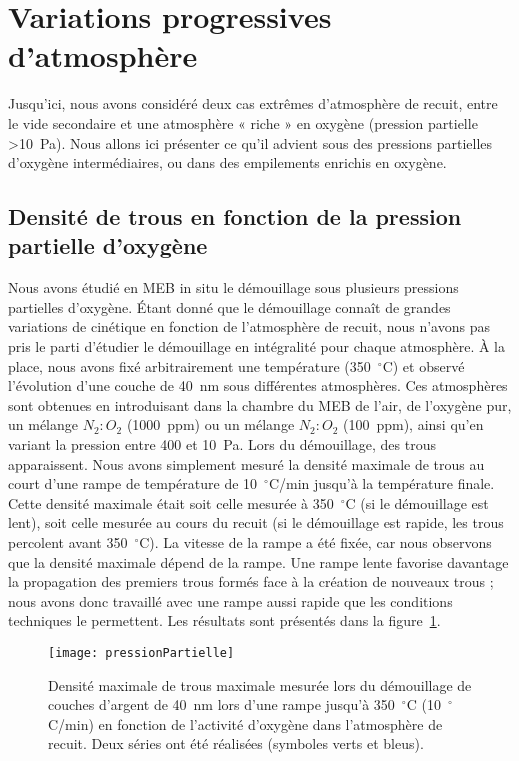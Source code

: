 \section{Variations progressives d'atmosphère}
Jusqu’ici, nous avons considéré deux cas extrêmes d’atmosphère de recuit, entre le vide secondaire et une atmosphère « riche » en oxygène (pression partielle >10~Pa). Nous allons ici présenter ce qu’il advient sous des pressions partielles d’oxygène intermédiaires, ou dans des empilements enrichis en oxygène.\par 
	\subsection{Densité de trous en fonction de la pression partielle d'oxygène}
Nous avons étudié en MEB in situ le démouillage sous plusieurs pressions partielles d’oxygène. Étant donné que le démouillage connaît de grandes variations de cinétique en fonction de l’atmosphère de recuit, nous n’avons pas pris le parti d’étudier le démouillage en intégralité pour chaque atmosphère. À la place, nous avons fixé arbitrairement une température (350~$^\circ$C) et observé l’évolution d’une couche de 40~nm sous différentes atmosphères. Ces atmosphères sont obtenues en introduisant dans la chambre du MEB de l'air, de l'oxygène pur, un mélange $N_2:O_2$ (1000~ppm) ou un mélange $N_2:O_2$ (100~ppm), ainsi qu'en variant la pression entre 400 et 10~Pa. Lors du démouillage, des trous apparaissent. Nous avons simplement mesuré la densité maximale de trous au court d’une rampe de température de 10~$^\circ$C/min jusqu’à la température finale. Cette densité maximale était soit celle mesurée à 350~$^\circ$C (si le démouillage est lent), soit celle mesurée au cours du recuit (si le démouillage est rapide, les trous percolent avant 350~$^\circ$C). La vitesse de la rampe a été fixée, car nous observons que la densité maximale dépend de la rampe. Une rampe lente favorise davantage la propagation des premiers trous formés face à la création de nouveaux trous ; nous avons donc travaillé avec une rampe aussi rapide que les conditions techniques le permettent. Les résultats sont présentés dans la figure~\ref{pressionPartielle}.\par 
\begin{figure}[!htb]
\centering
\texttt{[image: pressionPartielle]}
\caption{Densité  maximale de trous maximale mesurée lors du démouillage de couches d’argent de 40~nm lors d’une rampe jusqu’à 350~$^\circ$C (10~$^\circ$C/min) en fonction de l’activité d’oxygène dans l’atmosphère de recuit. Deux séries ont été réalisées (symboles verts et bleus).}
\label{pressionPartielle}
\end{figure}
